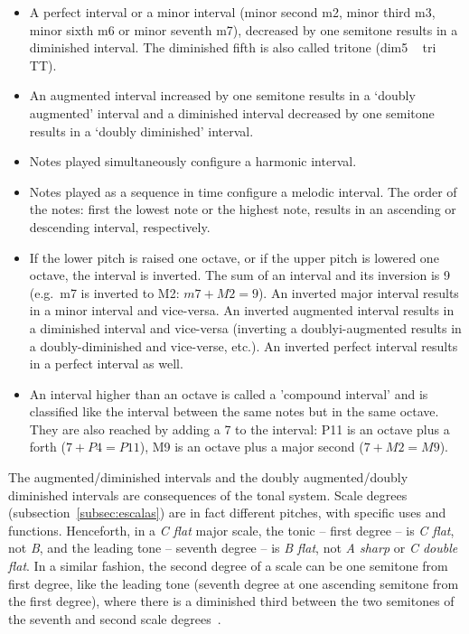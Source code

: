 \begin{itemize}
                \item A perfect interval or a minor interval (minor second m2, minor third m3, minor sixth m6 or minor seventh m7), decreased by one semitone results in a diminished interval. The
diminished fifth is also called tritone (dim5 ~ tri ~ TT).

                \item An augmented interval increased by one semitone results in a `doubly augmented' interval and a diminished interval decreased by one semitone results in a `doubly diminished' interval.

                \item Notes played simultaneously configure a harmonic
                interval.

                \item Notes played as a sequence in time configure a
                melodic interval. The order of the notes: first
                the lowest note or the highest note, results in an ascending or descending interval, respectively.

                \item If the lower pitch is raised one octave, or if
                the upper pitch is lowered one octave, the interval is
                inverted. The sum of an interval and its inversion is
                9 (e.g.\ m7 is inverted to M2: $m7+M2=9$). An inverted major
                interval results in a minor interval and vice-versa. An
                inverted augmented interval results in a diminished interval
                and vice-versa (inverting a doublyi-augmented results in a
                doubly-diminished and vice-verse, etc.).
                An inverted perfect interval results in a perfect interval as well.

                \item An interval higher than an octave is called a 'compound interval' and is classified like the interval between the same notes but in the same octave. They are also reached by adding a
                7 to the interval: P11 is an octave plus a forth ($7 + P4 = P11$), M9 is an octave plus a major second ($7 + M2 = M9$).
\end{itemize}

The augmented/diminished intervals and the doubly augmented/doubly diminished intervals are consequences of the tonal system.
Scale degrees (subsection~\ref{subsec:escalas}) are in fact different pitches, with specific uses and functions. Henceforth, in a \textit{C flat} major scale, the tonic -- first degree -- is \textit{C flat}, not \textit{B}, and the leading tone -- seventh degree -- is \textit{B flat}, not \textit{A sharp} or \textit{C double flat}. In a similar fashion, the second degree of a scale can be one semitone from first degree, like the leading tone (seventh degree at one ascending semitone from the first degree), where there is a diminished third between the two semitones of the seventh and second scale degrees~\cite{Lacerda}.

